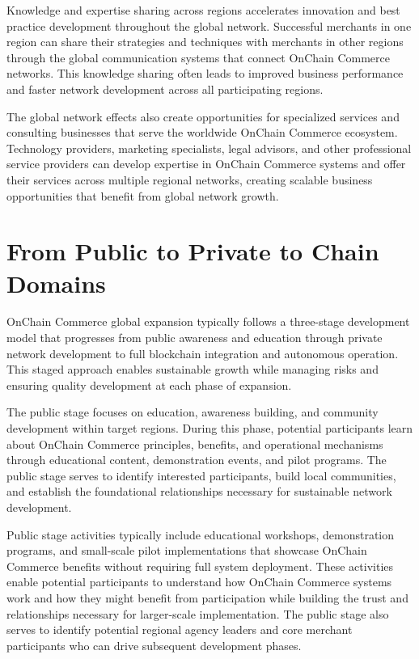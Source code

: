 \documentclass[
  Letterpaper,
]{scrbook}
\begin{document}
Knowledge and expertise sharing across regions accelerates innovation
and best practice development throughout the global network. Successful
merchants in one region can share their strategies and techniques with
merchants in other regions through the global communication systems that
connect OnChain Commerce networks. This knowledge sharing often leads to
improved business performance and faster network development across all
participating regions.

The global network effects also create opportunities for specialized
services and consulting businesses that serve the worldwide OnChain
Commerce ecosystem. Technology providers, marketing specialists, legal
advisors, and other professional service providers can develop expertise
in OnChain Commerce systems and offer their services across multiple
regional networks, creating scalable business opportunities that benefit
from global network growth.

\section{From Public to Private to Chain
Domains}\label{from-public-to-private-to-chain-domains}

OnChain Commerce global expansion typically follows a three-stage
development model that progresses from public awareness and education
through private network development to full blockchain integration and
autonomous operation. This staged approach enables sustainable growth
while managing risks and ensuring quality development at each phase of
expansion.

The public stage focuses on education, awareness building, and community
development within target regions. During this phase, potential
participants learn about OnChain Commerce principles, benefits, and
operational mechanisms through educational content, demonstration
events, and pilot programs. The public stage serves to identify
interested participants, build local communities, and establish the
foundational relationships necessary for sustainable network
development.

Public stage activities typically include educational workshops,
demonstration programs, and small-scale pilot implementations that
showcase OnChain Commerce benefits without requiring full system
deployment. These activities enable potential participants to understand
how OnChain Commerce systems work and how they might benefit from
participation while building the trust and relationships necessary for
larger-scale implementation. The public stage also serves to identify
potential regional agency leaders and core merchant participants who can
drive subsequent development phases.
\end{document}
